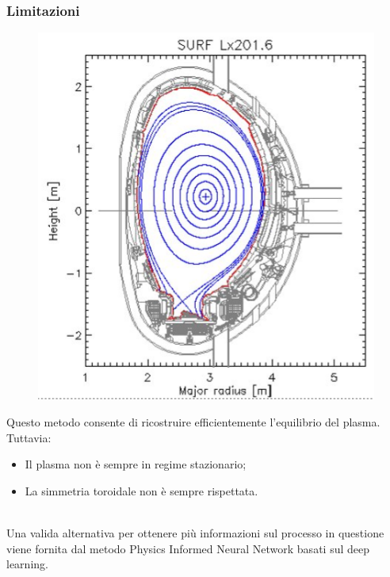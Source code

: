 \documentclass{beamer}
\begin{document}
\begin{frame}
	\frametitle{Limitazioni}
	\begin{minipage}[t]{0.45\textwidth}
		\begin{figure}
			\includegraphics[scale=0.4]{2022-06-07-13-17-56.png}%
		\end{figure}
	\end{minipage}
	\begin{minipage}[t]{0.45\textwidth}
		Questo metodo consente di ricostruire efficientemente l'equilibrio del plasma. Tuttavia:\begin{itemize}
			\item Il plasma non è sempre in regime stazionario;
			\item La simmetria toroidale non è sempre rispettata.
		\end{itemize}
	\end{minipage}\\
	\medskip
	Una valida alternativa per ottenere più informazioni sul processo in questione viene fornita dal metodo Physics Informed Neural Network basati sul deep learning.
\end{frame}
\end{document}
